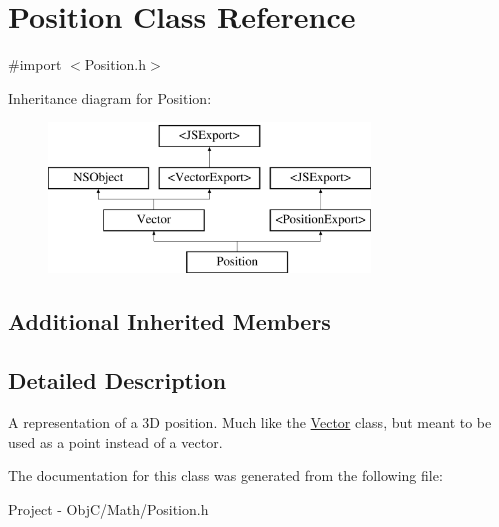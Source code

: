 \hypertarget{interface_position}{}\section{Position Class Reference}
\label{interface_position}


{\ttfamily \#import $<$Position.\+h$>$}

Inheritance diagram for Position\+:\begin{figure}[H]
\begin{center}
\leavevmode
\includegraphics[height=4.000000cm]{interface_position}
\end{center}
\end{figure}
\subsection*{Additional Inherited Members}


\subsection{Detailed Description}
A representation of a 3\+D position. Much like the \hyperlink{interface_vector}{Vector} class, but meant to be used as a point instead of a vector. 

The documentation for this class was generated from the following file\+:\begin{DoxyCompactItemize}
\item 
Project -\/ Obj\+C/\+Math/Position.\+h\end{DoxyCompactItemize}
